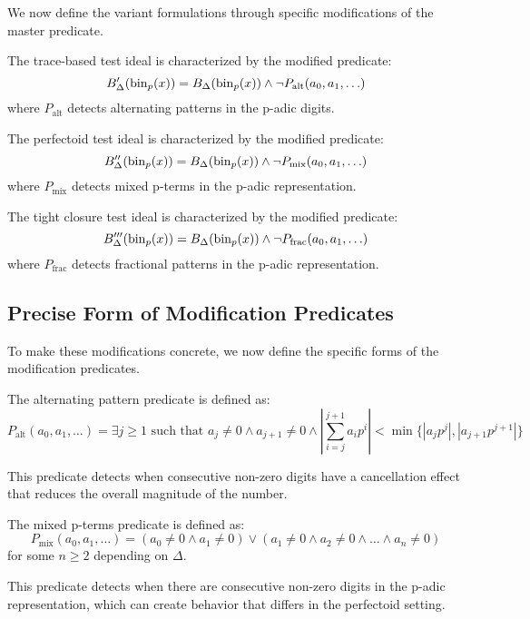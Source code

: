 We now define the variant formulations through specific modifications of the master predicate.

\begin{definition}\label{def:trace-based-predicate}
The trace-based test ideal is characterized by the modified predicate:
$$B'_\Delta(\operatorname{bin}_p(x)) = B_\Delta(\operatorname{bin}_p(x)) \wedge \neg P_{\text{alt}}(a_0, a_1, \ldots)$$
where $P_{\text{alt}}$ detects alternating patterns in the p-adic digits.
\end{definition}

\begin{definition}\label{def:perfectoid-predicate}
The perfectoid test ideal is characterized by the modified predicate:
$$B''_\Delta(\operatorname{bin}_p(x)) = B_\Delta(\operatorname{bin}_p(x)) \wedge \neg P_{\text{mix}}(a_0, a_1, \ldots)$$
where $P_{\text{mix}}$ detects mixed p-terms in the p-adic representation.
\end{definition}

\begin{definition}\label{def:tight-closure-predicate}
The tight closure test ideal is characterized by the modified predicate:
$$B'''_\Delta(\operatorname{bin}_p(x)) = B_\Delta(\operatorname{bin}_p(x)) \wedge \neg P_{\text{frac}}(a_0, a_1, \ldots)$$
where $P_{\text{frac}}$ detects fractional patterns in the p-adic representation.
\end{definition}

\subsection{Precise Form of Modification Predicates}

To make these modifications concrete, we now define the specific forms of the modification predicates.

\begin{definition}\label{def:alternating-pattern}
The alternating pattern predicate is defined as:
$$P_{\text{alt}}(a_0, a_1, \ldots) = \exists j \geq 1 \text{ such that } a_j \neq 0 \wedge a_{j+1} \neq 0 \wedge \left|\sum_{i=j}^{j+1} a_i p^i\right| < \min\{|a_j p^j|, |a_{j+1} p^{j+1}|\}$$

This predicate detects when consecutive non-zero digits have a cancellation effect that reduces the overall magnitude of the number.
\end{definition}

\begin{definition}\label{def:mixed-p-terms}
The mixed p-terms predicate is defined as:
$$P_{\text{mix}}(a_0, a_1, \ldots) = (a_0 \neq 0 \wedge a_1 \neq 0) \vee (a_1 \neq 0 \wedge a_2 \neq 0 \wedge \ldots \wedge a_n \neq 0)$$
for some $n \geq 2$ depending on $\Delta$.

This predicate detects when there are consecutive non-zero digits in the p-adic representation, which can create behavior that differs in the perfectoid setting.
\end{definition}

